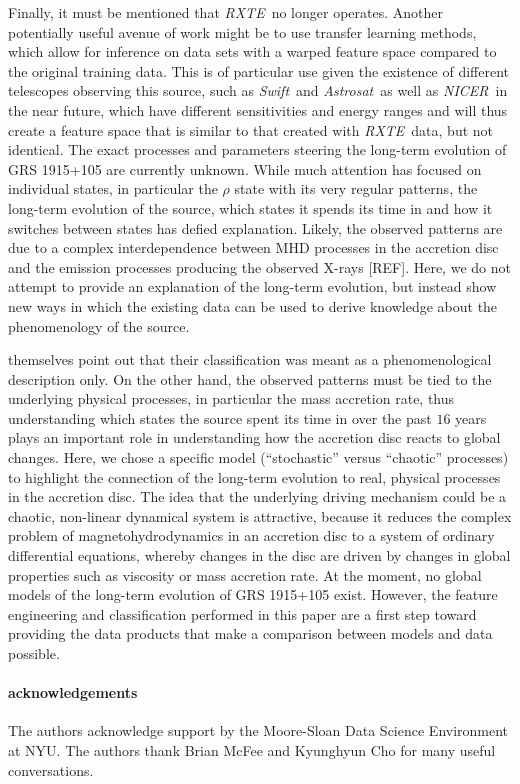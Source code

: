\documentclass[12pt]{emulateapj}
\newcommand{\project}[1]{\textsl{#1}}
\newcommand{\rxte}{\project{RXTE}}
\newcommand{\swift}{\project{Swift}}
\newcommand{\astrosat}{\project{Astrosat}}
\newcommand{\nicer}{\project{NICER}}
\begin{document}
Finally, it must be mentioned that \rxte\ no longer operates. Another potentially useful avenue of work might be to use transfer learning methods, which allow 
for inference on data sets with a warped feature space compared to the original training data. This is of particular use given the existence of different telescopes 
observing this source, such as \swift\ and \astrosat\, as well as \nicer\ in the near future, which have different sensitivities and energy ranges and will thus create a feature space that is similar to that created with \rxte\ data, but 
not identical.
The exact processes and parameters steering the long-term evolution of GRS 1915+105 are currently unknown. While much attention has focused on 
individual states, in particular the $\rho$ state with its very regular patterns, the long-term evolution of the source, which states it spends its time in and how 
it switches between states has defied explanation. Likely, the observed patterns are due to a complex interdependence between MHD processes in the accretion 
disc and the emission processes producing the observed X-rays [REF]. Here, we do not attempt to provide an explanation of the long-term evolution, but instead show 
new ways in which the existing data can be used to derive knowledge about the phenomenology of the source.

\citet{belloni2000} themselves point out that their classification was meant as a phenomenological description only. On the other hand, the observed patterns 
must be tied to the underlying physical processes, in particular the mass accretion rate, thus understanding which states the source spent its time in over the 
past $16$ years plays an important role in understanding how the accretion disc reacts to global changes. Here, we chose a specific model (``stochastic'' versus 
``chaotic'' processes) to highlight the connection of the long-term evolution to real, physical processes in the accretion disc. The idea that the underlying driving 
mechanism could be a chaotic, non-linear dynamical system is attractive, %
because it reduces the complex problem of magnetohydrodynamics in an 
accretion disc to a system of ordinary differential equations, whereby changes in the disc are driven by changes in global properties such as viscosity or mass 
accretion rate. At the moment, no global models of the long-term evolution of GRS 1915+105 exist. However, the feature engineering and classification performed 
in this paper are a first step toward providing the data products that make a comparison between models and data possible.

\paragraph{acknowledgements}
The authors acknowledge support by the Moore-Sloan Data Science Environment at NYU. The authors thank Brian McFee and Kyunghyun Cho for many useful conversations.



\end{document}
